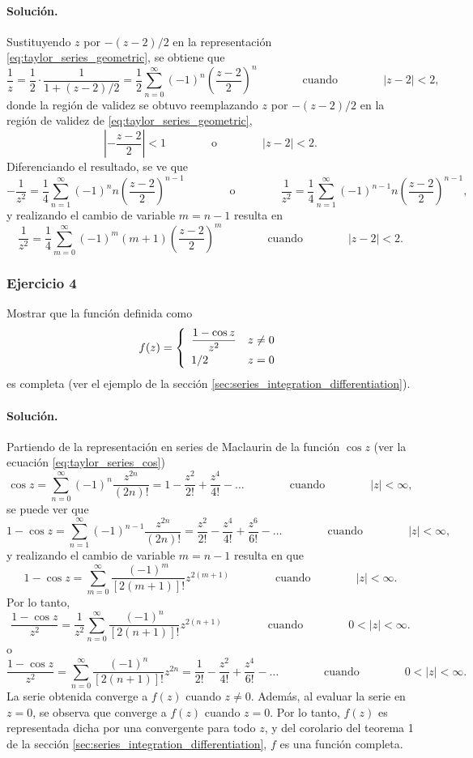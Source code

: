 \documentclass[a4paper]{report}
\begin{document}
\paragraph{Solución.} Sustituyendo \(z\) por \(-(z-2)/2\) en la representación \ref{eq:taylor_series_geometric}, se obtiene que 
\[
 \frac{1}{z}=\frac{1}{2}\cdot\frac{1}{1+(z-2)/2}=\frac{1}{2}\sum_{n=0}^\infty(-1)^n\left(\frac{z-2}{2}\right)^n
 \qquad\qquad\textrm{cuando}\qquad\qquad
 |z-2|<2,
\]
donde la región de validez se obtuvo reemplazando \(z\) por \(-(z-2)/2\) en la región de validez de \ref{eq:taylor_series_geometric},
\[
 \left|-\frac{z-2}{2}\right|<1
 \qquad\qquad\textrm{o}\qquad\qquad
 |z-2|<2.
\]
Diferenciando el resultado, se ve que
\[
 -\frac{1}{z^2}=\frac{1}{4}\sum_{n=1}^\infty(-1)^nn\left(\frac{z-2}{2}\right)^{n-1}
 \qquad\qquad\textrm{o}\qquad\qquad
 \frac{1}{z^2}=\frac{1}{4}\sum_{n=1}^\infty(-1)^{n-1}n\left(\frac{z-2}{2}\right)^{n-1},
\]
y realizando el cambio de variable \(m=n-1\) resulta en 
\[
 \frac{1}{z^2}=\frac{1}{4}\sum_{m=0}^\infty(-1)^m(m+1)\left(\frac{z-2}{2}\right)^m
 \qquad\qquad\textrm{cuando}\qquad\qquad
 |z-2|<2. 
\]

\subsubsection*{Ejercicio 4}

Mostrar que la función definida como
\[
 f(z)=
 \left\{ 
 \begin{array}{ll}
  \dfrac{1-\cos z}{z^2} & z\neq0\\[\medskipamount]
  1/2 & z=0
 \end{array}
 \right.
\]
es completa (ver el ejemplo de la sección \ref{sec:series_integration_differentiation}).

\paragraph{Solución.} Partiendo de la representación en series de Maclaurin de la función \(\cos z\) (ver la ecuación \ref{eq:taylor_series_cos})
\[
 \cos z=\sum_{n=0}^\infty(-1)^n\frac{z^{2n}}{(2n)!}=1-\frac{z^2}{2!}+\frac{z^4}{4!}-\dots
 \qquad\qquad\textrm{cuando}\qquad\qquad
 |z|<\infty,
\]
se puede ver que 
\[
 1-\cos z=\sum_{n=1}^\infty(-1)^{n-1}\frac{z^{2n}}{(2n)!}=\frac{z^2}{2!}-\frac{z^4}{4!}+\frac{z^6}{6!}-\dots
 \qquad\qquad\textrm{cuando}\qquad\qquad
 |z|<\infty,
\]
y realizando el cambio de variable \(m=n-1\) resulta en que 
\[
 1-\cos z=\sum_{m=0}^\infty\frac{(-1)^m}{[2(m+1)]!}z^{2(m+1)}
 \qquad\qquad\textrm{cuando}\qquad\qquad
 |z|<\infty.
\]
Por lo tanto,
\[
 \frac{1-\cos z}{z^2}=\frac{1}{z^2}\sum_{n=0}^\infty\frac{(-1)^n}{[2(n+1)]!}z^{2(n+1)}
 \qquad\qquad\textrm{cuando}\qquad\qquad
 0<|z|<\infty.
\]
o 
\[
 \frac{1-\cos z}{z^2}=\sum_{n=0}^\infty\frac{(-1)^n}{[2(n+1)]!}z^{2n}
 =\frac{1}{2!}-\frac{z^2}{4!}+\frac{z^4}{6!}-\dots
 \qquad\qquad\textrm{cuando}\qquad\qquad
 0<|z|<\infty.
\] 
La serie obtenida converge a \(f(z)\) cuando \(z\neq0\). Además, al evaluar la serie en \(z=0\), se observa que converge a \(f(z)\) cuando \(z=0\). Por lo tanto, \(f(z)\) es representada dicha por una convergente para todo \(z\), y del corolario del teorema 1 de la sección \ref{sec:series_integration_differentiation}, \(f\) es una función completa.
 
\end{document}
